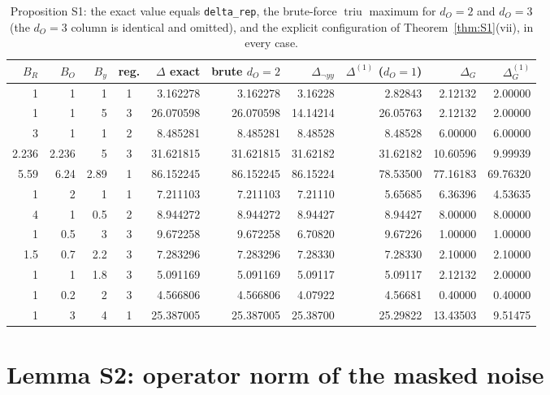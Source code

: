 \documentclass[11pt]{article}
\theoremstyle{definition}
\theoremstyle{plain}
\DeclareMathOperator{\triu}{triu}
\begin{document}
\begin{table}[h]
\centering\small
\begin{tabular}{@{}rrrcrrrrrr@{}}
\toprule
$B_R$ & $B_O$ & $B_y$ & reg. & $\Delta$ exact & brute $d_O{=}2$ & $\Delta_{\neg yy}$ & $\Delta^{(1)}$ ($d_O{=}1$) & $\Delta_G$ & $\Delta_G^{(1)}$\\
\midrule
1 & 1 & 1 & 1 & 3.162278 & 3.162278 & 3.16228 & 2.82843 & 2.12132 & 2.00000\\
1 & 1 & 5 & 3 & 26.070598 & 26.070598 & 14.14214 & 26.05763 & 2.12132 & 2.00000\\
3 & 1 & 1 & 2 & 8.485281 & 8.485281 & 8.48528 & 8.48528 & 6.00000 & 6.00000\\
2.236 & 2.236 & 5 & 3 & 31.621815 & 31.621815 & 31.62182 & 31.62182 & 10.60596 & 9.99939\\
5.59 & 6.24 & 2.89 & 1 & 86.152245 & 86.152245 & 86.15224 & 78.53500 & 77.16183 & 69.76320\\
1 & 2 & 1 & 1 & 7.211103 & 7.211103 & 7.21110 & 5.65685 & 6.36396 & 4.53635\\
4 & 1 & 0.5 & 2 & 8.944272 & 8.944272 & 8.94427 & 8.94427 & 8.00000 & 8.00000\\
1 & 0.5 & 3 & 3 & 9.672258 & 9.672258 & 6.70820 & 9.67226 & 1.00000 & 1.00000\\
1.5 & 0.7 & 2.2 & 3 & 7.283296 & 7.283296 & 7.28330 & 7.28330 & 2.10000 & 2.10000\\
1 & 1 & 1.8 & 3 & 5.091169 & 5.091169 & 5.09117 & 5.09117 & 2.12132 & 2.00000\\
1 & 0.2 & 2 & 3 & 4.566806 & 4.566806 & 4.07922 & 4.56681 & 0.40000 & 0.40000\\
1 & 3 & 4 & 1 & 25.387005 & 25.387005 & 25.38700 & 25.29822 & 13.43503 & 9.51475\\
\bottomrule
\end{tabular}
\caption{Proposition S1: the exact value equals \texttt{delta\_rep}, the brute-force $\triu$ maximum for $d_O=2$ and $d_O=3$ (the $d_O=3$ column is identical and omitted), and the explicit configuration of Theorem~\ref{thm:S1}(vii), in every case.}
\label{tab:S1num}
\end{table}

\section{Lemma S2: operator norm of the masked noise}
\label{sec:S2}
\end{document}

